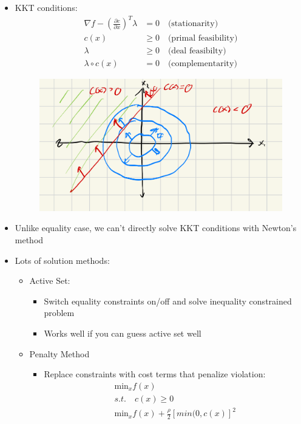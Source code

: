\documentclass[11pt]{article}
\begin{document}
\begin{itemize}
    \item KKT conditions:
    \begin{align*}
        \nabla f - \left(\frac{\partial c}{\partial x}\right)^T\lambda &= 0 \quad \text{(stationarity)}
        \\
        c(x) &\geq 0 \quad \text{(primal feasibility)}
        \\
        \lambda &\geq 0 \quad \text{(deal feasibilty)}
        \\
        \lambda\circ c(x) &= 0 \quad \text{(complementarity)}
    \end{align*}
    \begin{figure}[H]
        \centering
        \includegraphics[width=0.5\linewidth]{lecture_5_1.png}
    \end{figure}
    \item Unlike equality case, we can't directly solve KKT conditions with Newton's method
    \item Lots of solution methods:
    \begin{itemize}
        \item Active Set:
        \begin{itemize}
            \item Switch equality constraints on/off and solve inequality constrained problem
            \item Works well if you can guess active set well
        \end{itemize}
        \item Penalty Method
        \begin{itemize}
            \item Replace constraints with cost terms that penalize violation:
            \begin{align*}
                \text{min}_x f(x) 
                \\
                s.t. \quad c(x)\geq 0
                \\
                \text{min}_x f(x) + \frac{\rho}{2}[min(0,c(x)]^2
            \end{align*}

\end{itemize}
\end{itemize}
\end{itemize}
\end{document}
